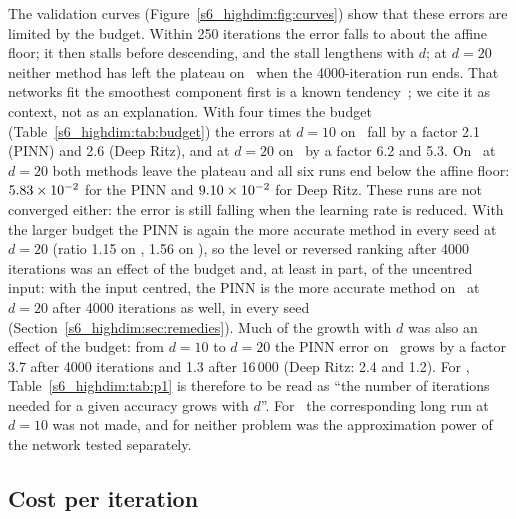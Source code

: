 The validation curves (Figure~\ref{s6_highdim:fig:curves}) show that these errors are limited
by the budget. Within 250 iterations the error falls to about the affine floor; it then stalls
before descending, and the stall lengthens with $d$; at $d=20$ neither method has left the
plateau on \Ptwo\ when the 4000-iteration run ends. That networks fit the smoothest component
first is a known tendency~\citep{rahaman2019}; we cite it as context, not as an explanation.
With four times the budget (Table~\ref{s6_highdim:tab:budget}) the errors at $d=10$ on \Pone\
fall by a factor 2.1 (PINN) and 2.6 (Deep Ritz), and at $d=20$ on \Pone\ by a factor 6.2 and
5.3. On \Ptwo\ at $d=20$ both methods leave the plateau and all six runs end below the affine
floor: $5.83\times 10^{-2}$ for the PINN and $9.10\times 10^{-2}$ for Deep Ritz. These runs are not
converged either: the error is still falling when the learning rate is reduced. With the larger
budget the PINN is again the more accurate method in every seed at $d=20$ (ratio 1.15 on
\Pone, 1.56 on \Ptwo), so the level or reversed ranking after 4000 iterations was an effect of
the budget and, at least in part, of the uncentred input:
with the input centred, the PINN is the more accurate method on \Pone\ at $d=20$ after 4000
iterations as well, in every seed (Section~\ref{s6_highdim:sec:remedies}). Much of the growth with
$d$ was also an effect of the budget: from $d=10$ to $d=20$ the PINN error on \Pone\
grows by a factor 3.7 after 4000 iterations and 1.3 after 16\,000 (Deep Ritz: 2.4 and 1.2).
For \Pone, Table~\ref{s6_highdim:tab:p1} is therefore to be read as ``the number of iterations
needed for a given accuracy grows with $d$''. For \Ptwo\ the corresponding long run at $d=10$
was not made, and for neither problem was the approximation power of the network tested
separately.

\subsection{Cost per iteration}\label{s6_highdim:sec:cost}


